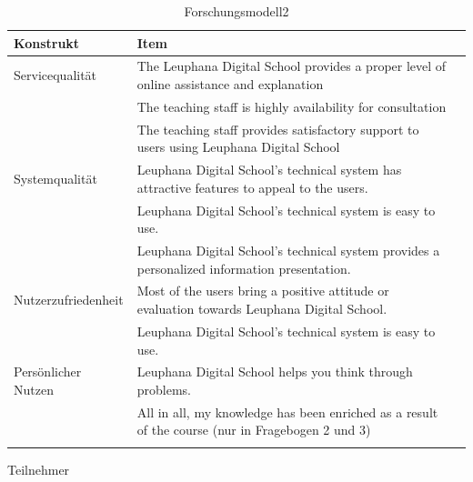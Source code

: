 \begin{table}[ht] 
\caption{Forschungsmodell2}
\label{tab:Forschungsmodell} 
\begin{tabular}{@{}lp{12cm}r@{}} \toprule

\textbf{Konstrukt} & \textbf{Item} \\ \midrule

Servicequalität & The Leuphana Digital School provides a proper level of online assistance and explanation \\ \addlinespace
& The teaching staff is highly availability for consultation\\\addlinespace
& \parbox[t]{12cm}{The teaching staff provides satisfactory support to users using Leuphana Digital School} \\ \addlinespace
Systemqualität & \parbox[t]{12cm}{Leuphana Digital School’s technical system has attractive features to appeal to the users.}\\ \addlinespace
& Leuphana Digital School’s technical system is easy to use. \\\addlinespace
& \parbox[t]{12cm}{Leuphana Digital School’s technical system provides a personalized information presentation.} \\ \addlinespace
Nutzerzufriedenheit & \parbox[t]{12cm}{Most of the users bring a positive attitude or evaluation towards Leuphana Digital School.} \\ \addlinespace
& Leuphana Digital School’s technical system is easy to use.  \\ \addlinespace 
Persönlicher Nutzen & \parbox[t]{12cm}{Leuphana Digital School helps you think through problems.} \\ \addlinespace 
& \parbox[t]{12cm}{All in all, my knowledge has been enriched as a result of the course (nur in Fragebogen 2 und 3)} \\ \addlinespace 
  \bottomrule

\end{tabular}	
\end{table}

Teilnehmer
   
